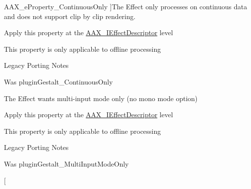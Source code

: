 \begin{Desc}
\begin{description}
{\hypertarget{a00283_a6571f4e41a5dd06e4067249228e2249ea95054276be8782d93437cd74669366d0}{}A\+A\+X\+\_\+e\+Property\+\_\+\+Continuous\+Only\label{a00283_a6571f4e41a5dd06e4067249228e2249ea95054276be8782d93437cd74669366d0}
}]The Effect only processes on continuous data and does not support \textquotesingle{}clip by clip\textquotesingle{} rendering. \begin{DoxyItemize}
\item Apply this property at the \hyperlink{a00096}{A\+A\+X\+\_\+\+I\+Effect\+Descriptor} level \item This property is only applicable to offline processing\end{DoxyItemize}
\begin{DoxyRefDesc}{Legacy Porting Notes}
\item[\hyperlink{a00384__porting_notes000053}{Legacy Porting Notes}]Was plugin\+Gestalt\+\_\+\+Continuous\+Only \end{DoxyRefDesc}
\item[{\em 
\hypertarget{a00283_a6571f4e41a5dd06e4067249228e2249eaa15cf3edd899af4a98fa18fcdfdeb9d6}{}A\+A\+X\+\_\+e\+Property\+\_\+\+Multi\+Input\+Mode\+Only\label{a00283_a6571f4e41a5dd06e4067249228e2249eaa15cf3edd899af4a98fa18fcdfdeb9d6}
}]The Effect wants multi-\/input mode only (no mono mode option) \begin{DoxyItemize}
\item Apply this property at the \hyperlink{a00096}{A\+A\+X\+\_\+\+I\+Effect\+Descriptor} level \item This property is only applicable to offline processing\end{DoxyItemize}
\begin{DoxyRefDesc}{Legacy Porting Notes}
\item[\hyperlink{a00384__porting_notes000054}{Legacy Porting Notes}]Was plugin\+Gestalt\+\_\+\+Multi\+Input\+Mode\+Only \end{DoxyRefDesc}
\item[{\em 
}
\end{description}
\end{Desc}

